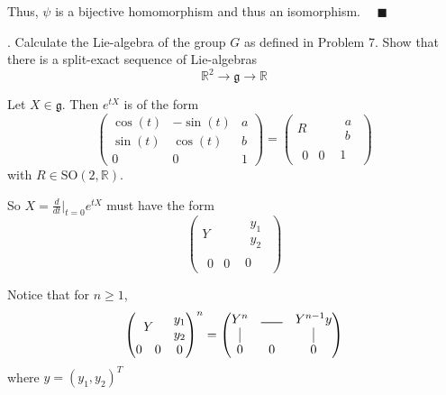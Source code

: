 \documentclass[11pt]{article}
\newcommand{\R}{\mathbb{R}}
\newcommand{\SO}{\text{SO}}
\newcommand{\lra}{\longrightarrow}
\newcommand{\gf}{\mathfrak{g}}
\newcommand{\qed}{\quad \blacksquare}
\begin{document}
		Thus, $\psi$ is a bijective homomorphism and thus an isomorphism. $\qed$

	\color{black}

.  Calculate the Lie-algebra of the group $G$ as defined in Problem 7.  Show that there is a split-exact sequence of Lie-algebras
\[
\R^{2} \lra \mathfrak{g} \lra \R
\]  

	\color{blue}
		Let $X \in \gf$. Then $e^{tX}$ is of the form 
		\[\begin{pmatrix}
			\cos(t) & -\sin(t) & a\\
			\sin(t) & \cos(t) & b\\
			0 & 0 & 1	
		\end{pmatrix} = \begin{pmatrix}
			R & \begin{matrix}
				a\\b
			\end{matrix}\\ 
			\begin{matrix}
				0 & 0
			\end{matrix} & 1
		\end{pmatrix}\] 
		with $R \in \SO(2, \R)$. 

		So $X = \frac{d}{dt} \bigg\vert_{t=0}e^{tX}$ must have the form 
		\[\begin{pmatrix}
			Y & \begin{matrix}
				y_1\\y_2
			\end{matrix}\\ 
			\begin{matrix}
				0 & 0
			\end{matrix} & 0
		\end{pmatrix}\] 

		Notice that for $n \geq 1$, 
		\[\begin{pmatrix}
			Y & \begin{matrix}
				y_1\\y_2
			\end{matrix}\\ 
			\begin{matrix}
				0 & 0
			\end{matrix} & 0
		\end{pmatrix}^n = \begin{pmatrix}
			Y^n & \rule{0.6cm}{0.2mm} & Y^{n-1}y \\
			\vline & & \vline\\
			0 & 0 & 0
		\end{pmatrix}\]
		where $y = (y_1, y_2)^T$
\end{document}
